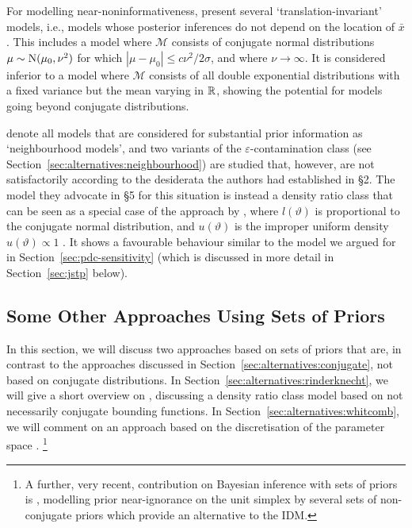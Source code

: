 For modelling near-noninformativeness, \textcite[\S 3]{1991:pericchi}
present several `translation-invariant' models,
i.e., models whose posterior inferences do not depend on the location of $\bar{x}$.
This includes a model where $\mathcal{M}$ consists of conjugate normal distributions $\mu \sim \operatorname{N}(\mu_0, \nu^2)$
for which $|\mu - \mu_0| \le c \nu^2 / 2\sigma$, and where $\nu \to \infty$.
It is considered inferior to a model where $\mathcal{M}$ consists of all double exponential distributions
with a fixed variance but the mean varying in $\mathbb{R}$, %
showing the potential for models going beyond conjugate distributions.

\textcite[\S 4]{1991:pericchi} denote all models that are considered
for substantial prior information as `neighbourhood models',
and two variants of the $\varepsilon$-contamination class (see Section~\ref{sec:alternatives:neighbourhood}) are studied
that, however, are not satisfactorily according to the desiderata the authors had established in \S 2.
The model they advocate in \S 5 for this situation %
is instead a density ratio class that
can be seen as a special case of the approach by \textcite[see below]{2011:rinderknecht:diss},
where $l(\vartheta)$ is proportional to the conjugate normal distribution,
and $u(\vartheta)$ is the improper uniform density $u(\vartheta) \propto 1$ \parencite[\S 4.3]{1991:pericchi}.
It shows a favourable behaviour similar to the model we argued for in Section~\ref{sec:pdc-sensitivity}
(which is discussed in more detail in Section~\ref{sec:jstp} below).


\subsection{Some Other Approaches Using Sets of Priors}
\label{sec:alternatives:other}

In this section, we will discuss two approaches based on sets of priors that are,
in contrast to the approaches discussed in Section~\ref{sec:alternatives:conjugate},
not based on conjugate distributions.
In Section~\ref{sec:alternatives:rinderknecht}, we
will give a short overview on \textcite[\S 4]{2011:rinderknecht:diss},
discussing a density ratio class model based on not necessarily conjugate bounding functions.
In Section~\ref{sec:alternatives:whitcomb}, we will comment on an approach based on the discretisation of the parameter space
\parencite{2005:whitcomb}.%
\footnote{A further, very recent, contribution on Bayesian inference with sets of priors
is \textcite{2013:mangilibenavoli}, modelling prior near-ignorance on the unit simplex
by several sets of non-conjugate priors which provide an alternative to the IDM.}

